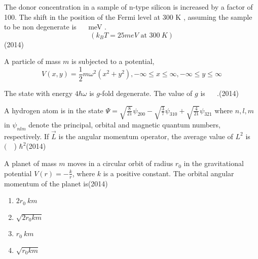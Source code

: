 \iffalse
\chapter{2014}
\author{Prajwal naik}
\section{ph}
\fi


 
    \item  The donor concentration in a sample of n-type silicon is increased by a factor of 100. The shift in the position of the Fermi level at 300 K , assuming the sample to be non degenerate is $\quad$ meV .
$$
(k_{B} T=25 {meV} \text { at } 300 {~K})
$$\hfill(2014)
   
        
  \item   A particle of mass $m$ is subjected to a potential,
$$
V(x, y)=\frac{1}{2} m \omega^{2}(x^{2}+y^{2}),-\infty \leq x \leq \infty,-\infty \leq y \leq \infty
$$

The state with energy $4 \hbar \omega$ is $g$-fold degenerate. The value of $g$ is $\quad$ .\hfill{(2014)}
 
  
  \item A hydrogen atom is in the state
$\Psi=\sqrt{\frac{8}{21}} \psi_{200}-\sqrt{\frac{3}{7}} \psi_{310}+\sqrt{\frac{4}{21}} \psi_{321}$
where $n, l, m$ in $\psi_{n l m}$ denote the principal, orbital and magnetic quantum numbers, respectively. If $\vec{L}$ is the angular momentum operator, the average value of $L^{2}$ is $(\quad$) $\hbar^{2}$\hfill{(2014)}
  
  \item A planet of mass $m$ moves in a circular orbit of radius $r_{0}$ in the gravitational potential $V(r)=-\frac{k}{r}$, where $k$ is a positive constant. The orbital angular momentum of the planet is\hfill{(2014)}
  \begin{multicols}{4}
			\begin{enumerate}
   \item $2 r_{0} {~km}$
\item $\sqrt{2 r_{0} k m}$
\item $r_{0} {~km}$
\item  $\sqrt{r_{0} k m}$
\end{enumerate}
		\end{multicols}
   
